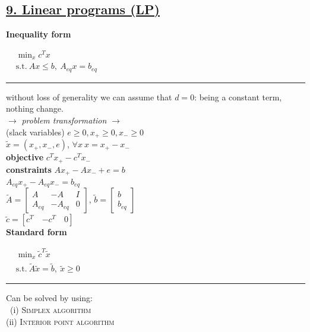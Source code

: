 \documentclass[a4paper]{article}
\begin{document}
\subsection*{\underline{9. Linear programs (LP)}}
\vspace{-0.3cm}
\raggedcolumns
\begin{multicols}{3}
    \noindent
    \textbf{Inequality form}
    \begin{center}
        $\begin{aligned}
            &\min_{x} c^T{x}\\
            &\text{s.t.}\ Ax\le{b}, \ A_{eq}x=b_{eq}            
        \end{aligned}$
    \end{center}
    \hrule
    without loss of generality we can assume that $d=0$: being a constant  term, nothing change.
    \newcolumn\\
    \textsf{$\longrightarrow$ \textit{problem transformation} $\longrightarrow$}\\
    {\small{
        (slack variables) $e\ge0, x_{+}\ge0, x_{-}\ge0$\\
        $\tilde{x}=(x_{+}, x_{-}, e)$, $\forall{x} \ x=x_{+}-x_{-}$\\
        \textbf{objective} $c^Tx_{+}-c^T{x_{-}}$\\
        \textbf{constraints}
        $Ax_{+}-Ax_{-}+e={b}$ \\
        $A_{eq}x_{+}-A_{eq}x_{-}=b_{eq}$\\
        $\tilde{A}=\begin{bmatrix}
            A&-A&I\\
            A_{eq}&-A_{eq}&0
        \end{bmatrix}$, $\tilde{b}=\begin{bmatrix}
            b\\b_{eq}
        \end{bmatrix}$\\
        $\tilde{c}=[c^T\quad{-c^T}\quad{0}]$
    }}
    \newcolumn\\
    \textbf{Standard form}
    \begin{center}
        $\begin{aligned}
            &\min_{x} {\tilde{c}^T{\tilde{x}}}\\
            &\text{s.t.} \ \tilde{A}\tilde{x}=\tilde{b}, \ \tilde{x}\ge0
        \end{aligned}$
    \end{center}
    \hrule
    Can be solved by using:\\
         \ (i) \textsc{Simplex algorithm}\\
        (ii) \textsc{Interior point algorithm}\\
\end{multicols}
\end{document}
